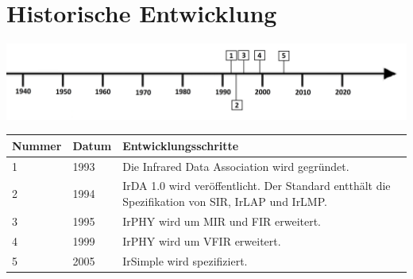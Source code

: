 \section*{Historische Entwicklung}
\includegraphics[width=\textwidth]{Kapitel/IrDA/Grafiken/Zeitstrahl.jpg}
\par
\noindent
\begin{tabular}{|p{1 cm}|p{3 cm}|p{13.55 cm}|}
	\hline
	Nummer & Datum & Entwicklungsschritte\\
	\hline
	1 & 1993 & Die Infrared Data Association wird gegründet.~\cite{wikipediade}\\
	\hline
	2 & 1994 & IrDA 1.0 wird veröffentlicht. Der Standard entthält die Spezifikation von SIR, IrLAP und IrLMP.~\cite{irdahistory}\\
	\hline
	3 & 1995 & IrPHY wird um MIR und FIR erweitert.~\cite{irdahistory}\\
	\hline
	4 & 1999 & IrPHY wird um VFIR erweitert.~\cite{irdahistory}\\
	\hline
	5 & 2005 & IrSimple wird spezifiziert.~\cite{wikipediade}\\
	\hline
\end{tabular}
\par
